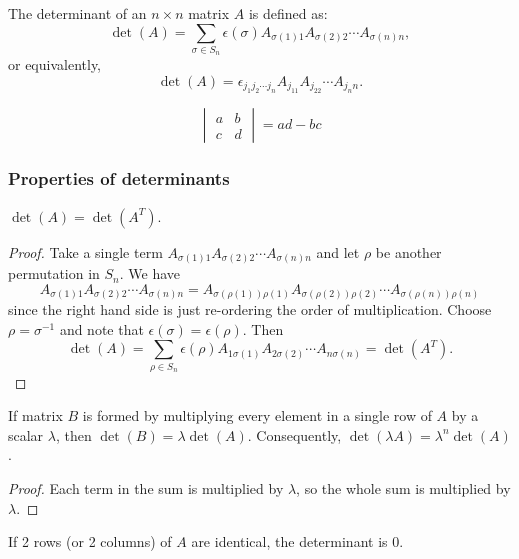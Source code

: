 \documentclass[a4paper]{article}
\begin{document}
\begin{defi}[Determinant]
  The determinant of an $n\times n$ matrix $A$ is defined as:
  \[
    \det (A) = \sum_{\sigma\in S_n} \epsilon(\sigma) A_{\sigma(1)1}A_{\sigma(2)2}\cdots A_{\sigma(n)n},
  \]
  or equivalently,
  \[
    \det(A) = \epsilon_{j_1j_2\cdots j_n}A_{j_11}A_{j_22}\cdots A_{j_nn}.
  \]
\end{defi}

\begin{prop}
  \[
    \begin{vmatrix}
      a & b\\
      c & d
    \end{vmatrix} = ad - bc
  \]
\end{prop}

\subsubsection{Properties of determinants}
\begin{prop}
  $\det (A) = \det (A^T)$.
\end{prop}

\begin{proof}
  Take a single term $A_{\sigma(1)1}A_{\sigma(2)2}\cdots A_{\sigma(n)n}$ and let $\rho$ be another permutation in $S_n$. We have
  \[
    A_{\sigma(1)1}A_{\sigma(2)2}\cdots A_{\sigma(n)n} = A_{\sigma(\rho(1))\rho(1)}A_{\sigma(\rho(2))\rho(2)}\cdots A_{\sigma(\rho(n))\rho(n)}
  \]
  since the right hand side is just re-ordering the order of multiplication. Choose $\rho = \sigma^{-1}$ and note that $\epsilon(\sigma) = \epsilon(\rho)$. Then
  \[
    \det(A) = \sum_{\rho\in S_n} \epsilon(\rho) A_{1\sigma(1)}A_{2\sigma(2)}\cdots A_{n\sigma(n)} = \det (A^T).
  \]
\end{proof}

\begin{prop}
  If matrix $B$ is formed by multiplying every element in a single row of $A$ by a scalar $\lambda$, then $\det (B) = \lambda \det (A)$. Consequently, $\det (\lambda A) = \lambda^n \det(A)$.
\end{prop}

\begin{proof}
  Each term in the sum is multiplied by $\lambda$, so the whole sum is multiplied by $\lambda$.
\end{proof}

\begin{prop}
  If 2 rows (or 2 columns) of $A$ are identical, the determinant is $0$.
\end{prop}
\end{document}
